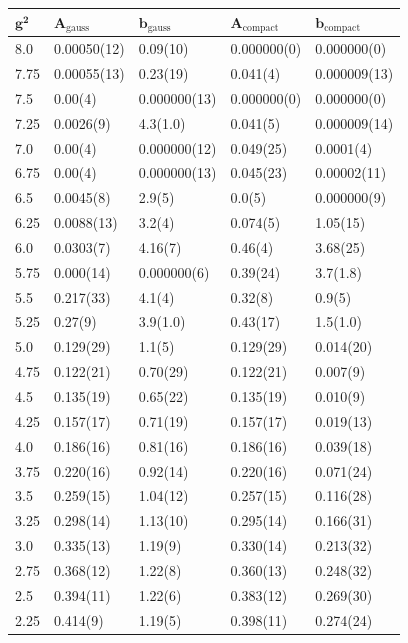 \begin{table}[!hb]
\centering
\begin{tabular}{lllll}
    $\mathbf{g^2}$ & $\mathbf{A_\mathrm{gauss}}$ & $\mathbf{b_\mathrm{gauss}}$ & $\mathbf{A_\mathrm{compact}}$ & $\mathbf{b_\mathrm{compact}}$ \\ \hline
   8.0 & 0.00050(12) & 0.09(10) & 0.000000(0) & 0.000000(0) \\
   7.75 & 0.00055(13) & 0.23(19) & 0.041(4) & 0.000009(13) \\
   7.5 & 0.00(4) & 0.000000(13) & 0.000000(0) & 0.000000(0) \\
   7.25 & 0.0026(9) & 4.3(1.0) & 0.041(5) & 0.000009(14) \\
   7.0 & 0.00(4) & 0.000000(12) & 0.049(25) & 0.0001(4) \\
   6.75 & 0.00(4) & 0.000000(13) & 0.045(23) & 0.00002(11) \\
   6.5 & 0.0045(8) & 2.9(5) & 0.0(5) & 0.000000(9) \\
   6.25 & 0.0088(13) & 3.2(4) & 0.074(5) & 1.05(15) \\
   6.0 & 0.0303(7) & 4.16(7) & 0.46(4) & 3.68(25) \\
   5.75 & 0.000(14) & 0.000000(6) & 0.39(24) & 3.7(1.8) \\
   5.5 & 0.217(33) & 4.1(4) & 0.32(8) & 0.9(5) \\
   5.25 & 0.27(9) & 3.9(1.0) & 0.43(17) & 1.5(1.0) \\
   5.0 & 0.129(29) & 1.1(5) & 0.129(29) & 0.014(20) \\
   4.75 & 0.122(21) & 0.70(29) & 0.122(21) & 0.007(9) \\
   4.5 & 0.135(19) & 0.65(22) & 0.135(19) & 0.010(9) \\
   4.25 & 0.157(17) & 0.71(19) & 0.157(17) & 0.019(13) \\
   4.0 & 0.186(16) & 0.81(16) & 0.186(16) & 0.039(18) \\
   3.75 & 0.220(16) & 0.92(14) & 0.220(16) & 0.071(24) \\
   3.5 & 0.259(15) & 1.04(12) & 0.257(15) & 0.116(28) \\
   3.25 & 0.298(14) & 1.13(10) & 0.295(14) & 0.166(31) \\
   3.0 & 0.335(13) & 1.19(9) & 0.330(14) & 0.213(32) \\
   2.75 & 0.368(12) & 1.22(8) & 0.360(13) & 0.248(32) \\
   2.5 & 0.394(11) & 1.22(6) & 0.383(12) & 0.269(30) \\
   2.25 & 0.414(9) & 1.19(5) & 0.398(11) & 0.274(24) \\

\end{tabular}
\end{table}
